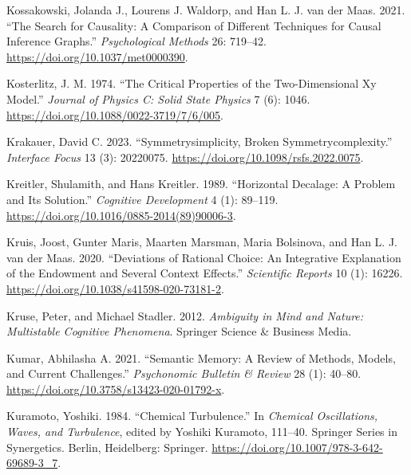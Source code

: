 \documentclass[
  a4paper,
  DIV=11,
  numbers=noendperiod]{scrreprt}
\newlength{\cslhangindent}
\newlength{\cslentryspacingunit} %
\newenvironment{CSLReferences}[2] %
 {%
  \setlength{\parindent}{0pt}
  \ifodd #1
  \let\oldpar\par
  \def\par{\hangindent=\cslhangindent\oldpar}
  \fi
  \setlength{\parskip}{#2\cslentryspacingunit}
 }%
 {}
\begin{document}
\begin{CSLReferences}{1}{0}
\leavevmode{}%
Kossakowski, Jolanda J., Lourens J. Waldorp, and Han L. J. van der Maas.
2021. {``The Search for Causality: {A} Comparison of Different
Techniques for Causal Inference Graphs.''} \emph{Psychological Methods}
26: 719--42. \url{https://doi.org/10.1037/met0000390}.

\leavevmode{}%
Kosterlitz, J. M. 1974. {``The Critical Properties of the
Two-Dimensional Xy Model.''} \emph{Journal of Physics C: Solid State
Physics} 7 (6): 1046. \url{https://doi.org/10.1088/0022-3719/7/6/005}.

\leavevmode{}%
Krakauer, David C. 2023. {``Symmetry\textendash simplicity, Broken
Symmetry\textendash complexity.''} \emph{Interface Focus} 13 (3):
20220075. \url{https://doi.org/10.1098/rsfs.2022.0075}.

\leavevmode{}%
Kreitler, Shulamith, and Hans Kreitler. 1989. {``Horizontal Decalage:
{A} Problem and Its Solution.''} \emph{Cognitive Development} 4 (1):
89--119. \url{https://doi.org/10.1016/0885-2014(89)90006-3}.

\leavevmode{}%
Kruis, Joost, Gunter Maris, Maarten Marsman, Maria Bolsinova, and Han L.
J. van der Maas. 2020. {``Deviations of Rational Choice: An Integrative
Explanation of the Endowment and Several Context Effects.''}
\emph{Scientific Reports} 10 (1): 16226.
\url{https://doi.org/10.1038/s41598-020-73181-2}.

\leavevmode{}%
Kruse, Peter, and Michael Stadler. 2012. \emph{Ambiguity in {Mind} and
{Nature}: {Multistable Cognitive Phenomena}}. {Springer Science \&
Business Media}.

\leavevmode{}%
Kumar, Abhilasha A. 2021. {``Semantic Memory: {A} Review of Methods,
Models, and Current Challenges.''} \emph{Psychonomic Bulletin \& Review}
28 (1): 40--80. \url{https://doi.org/10.3758/s13423-020-01792-x}.

\leavevmode{}%
Kuramoto, Yoshiki. 1984. {``Chemical {Turbulence}.''} In \emph{Chemical
{Oscillations}, {Waves}, and {Turbulence}}, edited by Yoshiki Kuramoto,
111--40. Springer {Series} in {Synergetics}. {Berlin, Heidelberg}:
{Springer}. \url{https://doi.org/10.1007/978-3-642-69689-3_7}.


\end{CSLReferences}
\end{document}
